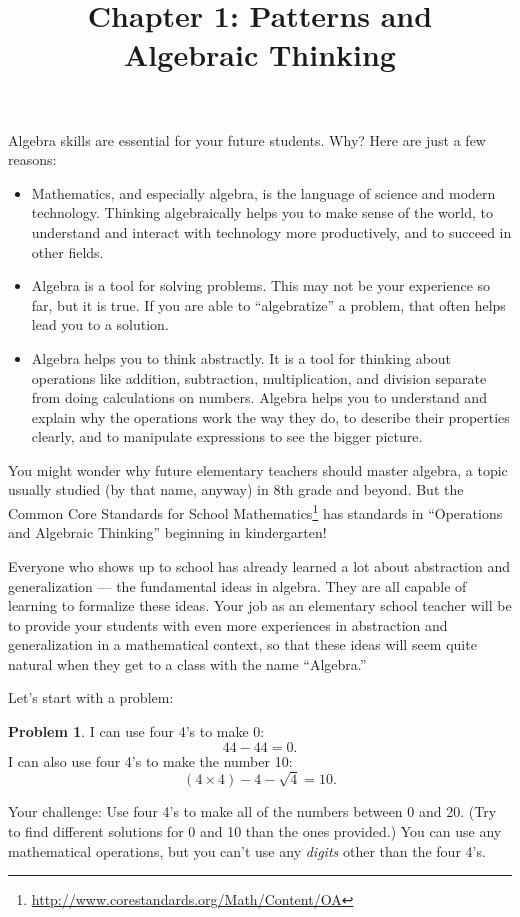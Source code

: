 \documentclass[12pt, reqno]{amsart}
\title{Chapter 1: Patterns and \\
Algebraic Thinking}
\theoremstyle{remark}
\theoremstyle{definition}
\newtheorem{problem}{Problem}
\numberwithin{equation}{section}  %
\begin{document}
\maketitle

Algebra skills are essential for your future students.  Why?  Here are just a few reasons:
\begin{itemize}
\item
Mathematics, and especially algebra, is the language of  science and modern technology.  Thinking algebraically helps you to make sense of the world, to understand and interact with technology  more productively, and to succeed in other fields.

\item
Algebra is a tool for solving problems.  This may not be your experience so far, but it is true.  If you are able to ``algebratize'' a problem, that often helps lead you to a solution.

\item
Algebra helps you to think abstractly.  It is a tool for thinking about operations like addition, subtraction, multiplication, and division separate from doing calculations on numbers.  Algebra helps you to understand and explain why the operations work the way they do, to describe their properties clearly, and to manipulate expressions to see the bigger picture.

\end{itemize}


You might wonder why future elementary teachers should master algebra, a topic usually studied (by that name, anyway) in 8th grade and beyond.  But the Common Core Standards for School Mathematics\footnote{\url{http://www.corestandards.org/Math/Content/OA}} has standards in ``Operations and Algebraic Thinking'' beginning in kindergarten!

Everyone who shows up to school has already learned a lot about abstraction and generalization --- the fundamental ideas in algebra.  They are all capable of learning to formalize these ideas.  Your job as an elementary school teacher will be to provide your students with even more experiences in abstraction and generalization in a mathematical context, so that these ideas will seem quite natural when they get to a class with the name ``Algebra.''

\newpage

Let's start with a problem:
\begin{problem}\label{prob: four4s}
I can use four 4's to make 0:
\[
44 - 44 = 0.
\]
I can also use four 4's to make the number 10:
\[
(4 \times 4) - 4 - \sqrt 4 = 10.
\]

Your challenge: Use four 4's to make all of the numbers between 0 and 20.  (Try to find different solutions for 0 and 10 than the ones provided.)
You can use any mathematical operations, but you can't use any \emph{digits} other than the four 4's.
\end{problem}
\end{document}
